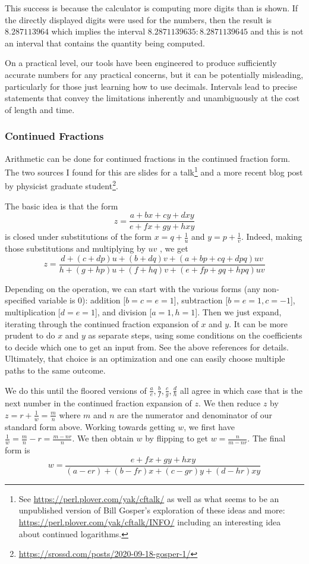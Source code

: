 \documentclass[12pt]{article}
\theoremstyle{remark}
\begin{document}
This success is because the calculator is computing more digits than is shown. If the directly displayed digits were used for the numbers, then the result is $8.287113964$ which implies the interval $8.2871139635:8.2871139645$ and this is not an interval that contains the quantity being computed. 

On a practical level, our tools have been engineered to produce sufficiently accurate numbers for any practical concerns, but it can be potentially misleading, particularly for those just learning how to use decimals. Intervals lead to precise statements that convey the limitations inherently and unambiguously at the cost of length and time.  


\subsubsection{Continued Fractions}

Arithmetic can be done for continued fractions in the continued fraction form. The two sources I found for this are slides for a talk\footnote{See \url{https://perl.plover.com/yak/cftalk/} as well as what seems to be an unpublished version of Bill Gosper's exploration of these ideas and more: \url{https://perl.plover.com/yak/cftalk/INFO/} including an interesting idea about continued logarithms.} and a more recent blog post by physicist graduate student\footnote{\url{https://srossd.com/posts/2020-09-18-gosper-1/}}. 

The basic idea is that the form $$z = \frac{a +bx + cy + dxy}{e + fx + gy + hxy}$$ is closed under substitutions of the form $x = q + \frac{1}{u}$ and $y = p + \frac{1}{v}$. Indeed, making those substitutions and multiplying by $uv$ , we get 
$$z = \frac{d + (c+d p) u + (b+dq)v + (a+bp + cq + dpq)uv}{h + (g+hp)u + (f+hq)v + (e+fp+ gq + hpq)uv}$$

Depending on the operation, we can start with the various forms (any non-specified variable is 0): addition [$b=c=e=1$], subtraction [$b=e=1, c=-1$], multiplication [$d=e=1$], and division [$a=1,h=1$]. Then we just expand, iterating through the continued fraction expansion of $x$ and $y$. It can be more prudent to do $x$ and $y$ as separate steps, using some conditions on the coefficients to decide which one to get an input from. See the above references for details. Ultimately, that choice is an optimization and one can easily choose multiple paths to the same outcome. 

We do this until the floored versions of $\frac{a}{e}, \frac{b}{f}, \frac{c}{g}, \frac{d}{h}$ all agree in which case that is the next number in the continued fraction expansion of $z$. We then reduce $z$ by $z = r + \frac{1}{w} = \frac{m}{n}$ where $m$ and $n$ are the numerator and denominator of our standard form above. Working towards getting $w$, we first have $\frac{1}{w} = \frac{m}{n} - r = \frac{m-nr}{n}$. We then obtain $w$ by flipping to get $w = \frac{n}{m-nr}$. The final form is 
$$w =  \frac{e + fx + gy + hxy}{(a-er) + (b-fr)x + (c-gr) y + (d-hr)xy}$$
\end{document}
